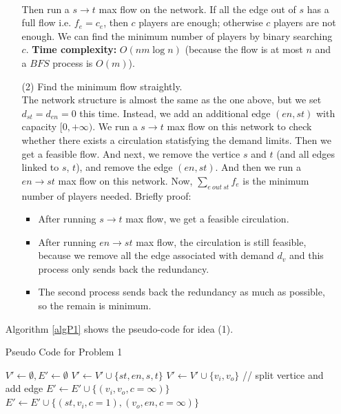 \documentclass{article}
\begin{document}
\begin{enumerate}
\begin{itemize}
\\
Then run a $s\rightarrow t$ max flow on the network. If all the edge out of $s$ has a full flow i.e. $f_e = c_e$, then $c$ players are enough; otherwise $c$ players are not enough. We can find the minimum number of players by binary searching $c$. \textbf{Time complexity:} $O(nm\log n)$ (because the flow is at most $n$ and a $BFS$ process is $O(m)$).
\item[(2)] Find the minimum flow straightly.\\
The network structure is almost the same as the one above, but we set $d_{st}=d_{en}=0$ this time. Instead, we add an additional edge $(en, st)$ with capacity $[0, +\infty)$. We run a $s\rightarrow t$ max flow on this network to check whether there exists a circulation statisfying the demand limits. Then we get a feasible flow. And next, we remove the vertice $s$ and $t$ (and all edges linked to $s$, $t$), and remove the edge $(en, st)$. And then we run a $en\rightarrow st$ max flow on this network. Now, $\sum_{e\ out\ st} f_e$ is the minimum number of players needed.
Briefly proof:\begin{itemize}
    \item After running $s\rightarrow t$ max flow, we get a feasible circulation.
    \item After running $en\rightarrow st$ max flow, the circulation is still feasible, because we remove all the edge associated with demand $d_v$ and this process only sends back the redundancy.
    \item The second process sends back the redundancy as much as possible, so the remain is minimum.  
\end{itemize}
\end{itemize}
Algorithm \ref{algP1} shows the pseudo-code for idea (1).\\
\begin{minipage}[H]{0.9\textwidth}
\begin{algorithm}[H]
\caption{Pseudo Code for Problem 1}
\label{algP1}
\begin{algorithmic}[1]
        \State $V'\leftarrow \emptyset, E'\leftarrow\emptyset$
        \State $V'\leftarrow V'\cup \{st, en, s, t\}$
            \State $V' \leftarrow V'\cup \{v_i, v_o\}$ // split vertice and add edge
            \State $E' \leftarrow E'\cup \{(v_i, v_o, c=\infty)\}$
            \State $E' \leftarrow E'\cup \{(st, v_i, c=1), (v_o, en, c=\infty)\}$

\end{algorithmic}
\end{algorithm}
\end{minipage}
\end{enumerate}
\end{document}
